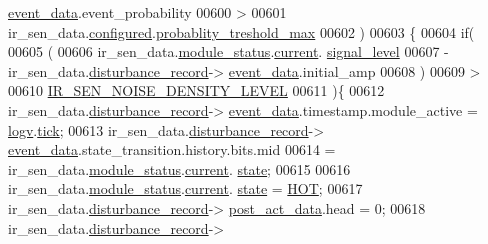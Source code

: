 \begin{DoxyCode}
      \hyperlink{a00028_a8c0bda69e71ef674e60da47ad0be9ab0}{event\_data}.event\_probability
00600                         >
00601                        ir\_sen\_data.\hyperlink{a00023_a94b2d1f6ea4ab334c74d24984dd27843}{configured}.\hyperlink{a00021_a7e2d217b9c9051d361319180a426851c}{probablity\_treshold\_max}
00602                      )
00603                    \{
00604                         \textcolor{keywordflow}{if}(
00605                             (
00606                             ir\_sen\_data.\hyperlink{a00023_a5a53c391562b059eb744ac679f3765ca}{module\_status}.\hyperlink{a00017_ab8af48cdbba92b3ae39c4470e53af944}{current}.
      \hyperlink{a00017_abcdf2bc0c2e5a14863938ae28c3bc96e}{signal\_level}
00607                             - ir\_sen\_data.\hyperlink{a00023_ac9b38e2c1d3f1013a88d33506c754152}{disturbance\_record}->
      \hyperlink{a00028_a8c0bda69e71ef674e60da47ad0be9ab0}{event\_data}.initial\_amp
00608                             )
00609                             >
00610                             \hyperlink{a00017_a2b2ec7850b6e5f2ba35f81301fc797dd}{IR\_SEN\_NOISE\_DENSITY\_LEVEL}
00611                           )\{
00612                              ir\_sen\_data.\hyperlink{a00023_ac9b38e2c1d3f1013a88d33506c754152}{disturbance\_record}->
      \hyperlink{a00028_a8c0bda69e71ef674e60da47ad0be9ab0}{event\_data}.timestamp.module\_active = \hyperlink{a00021_a2e89c46668b39a17753c238950c9e1ec}{logv}.\hyperlink{a00021_a81f0ce68c2c483fb8df726cc1988d8e8}{tick};
00613                              ir\_sen\_data.\hyperlink{a00023_ac9b38e2c1d3f1013a88d33506c754152}{disturbance\_record}->
      \hyperlink{a00028_a8c0bda69e71ef674e60da47ad0be9ab0}{event\_data}.state\_transition.history.bits.mid
00614                              = ir\_sen\_data.\hyperlink{a00023_a5a53c391562b059eb744ac679f3765ca}{module\_status}.\hyperlink{a00017_ab8af48cdbba92b3ae39c4470e53af944}{current}.
      \hyperlink{a00017_a6b8d8e916bc56265a3fd279bd26b6d1b}{state};
00615 
00616                              ir\_sen\_data.\hyperlink{a00023_a5a53c391562b059eb744ac679f3765ca}{module\_status}.\hyperlink{a00017_ab8af48cdbba92b3ae39c4470e53af944}{current}.
      \hyperlink{a00017_a6b8d8e916bc56265a3fd279bd26b6d1b}{state} = \hyperlink{a00021_a1eb14cc432874ddacd1934791dbe12a3}{HOT};
00617                              ir\_sen\_data.\hyperlink{a00023_ac9b38e2c1d3f1013a88d33506c754152}{disturbance\_record}->
      \hyperlink{a00028_a9c699c0cc82d0baa6e49195f185ab34f}{post\_act\_data}.head = 0;
00618                              ir\_sen\_data.\hyperlink{a00023_ac9b38e2c1d3f1013a88d33506c754152}{disturbance\_record}->

\end{DoxyCode}
